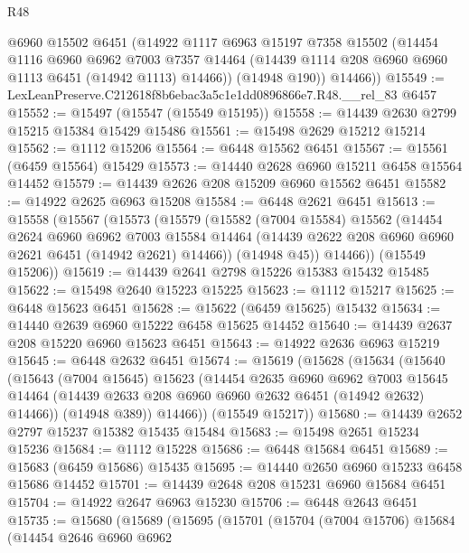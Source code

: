 \begin{lexlean}{R48}
\begin{coremodule}
        @6960
        @15502
        @6451
        (@14922
          @1117
          @6963
          @15197
          @7358
          @15502
          (@14454
            @1116
            @6960
            @6962
            @7003
            @7357
            @14464
            (@14439 @1114 @208 @6960 @6960 @1113 @6451 (@14942 @1113) @14466))
          (@14948 @190))
        @14466))
@15549 := LexLeanPreserve.C212618f8b6ebac3a5c1e1dd0896866e7.R48.__rel_83 @6457
@15552 := @15497 (@15547 (@15549 @15195))
@15558 := @14439 @2630 @2799 @15215 @15384 @15429 @15486
@15561 := @15498 @2629 @15212 @15214
@15562 := @1112 @15206
@15564 := @6448 @15562 @6451
@15567 := @15561 (@6459 @15564) @15429
@15573 := @14440 @2628 @6960 @15211 @6458 @15564 @14452
@15579 := @14439 @2626 @208 @15209 @6960 @15562 @6451
@15582 := @14922 @2625 @6963 @15208
@15584 := @6448 @2621 @6451
@15613 := @15558
    (@15567
      (@15573
        (@15579
          (@15582
            (@7004 @15584)
            @15562
            (@14454
              @2624
              @6960
              @6962
              @7003
              @15584
              @14464
              (@14439 @2622 @208 @6960 @6960 @2621 @6451 (@14942 @2621) @14466))
            (@14948 @45))
          @14466))
      (@15549 @15206))
@15619 := @14439 @2641 @2798 @15226 @15383 @15432 @15485
@15622 := @15498 @2640 @15223 @15225
@15623 := @1112 @15217
@15625 := @6448 @15623 @6451
@15628 := @15622 (@6459 @15625) @15432
@15634 := @14440 @2639 @6960 @15222 @6458 @15625 @14452
@15640 := @14439 @2637 @208 @15220 @6960 @15623 @6451
@15643 := @14922 @2636 @6963 @15219
@15645 := @6448 @2632 @6451
@15674 := @15619
    (@15628
      (@15634
        (@15640
          (@15643
            (@7004 @15645)
            @15623
            (@14454
              @2635
              @6960
              @6962
              @7003
              @15645
              @14464
              (@14439 @2633 @208 @6960 @6960 @2632 @6451 (@14942 @2632) @14466))
            (@14948 @389))
          @14466))
      (@15549 @15217))
@15680 := @14439 @2652 @2797 @15237 @15382 @15435 @15484
@15683 := @15498 @2651 @15234 @15236
@15684 := @1112 @15228
@15686 := @6448 @15684 @6451
@15689 := @15683 (@6459 @15686) @15435
@15695 := @14440 @2650 @6960 @15233 @6458 @15686 @14452
@15701 := @14439 @2648 @208 @15231 @6960 @15684 @6451
@15704 := @14922 @2647 @6963 @15230
@15706 := @6448 @2643 @6451
@15735 := @15680
    (@15689
      (@15695
        (@15701
          (@15704
            (@7004 @15706)
            @15684
            (@14454
              @2646
              @6960
              @6962

\end{coremodule}
\end{lexlean}
